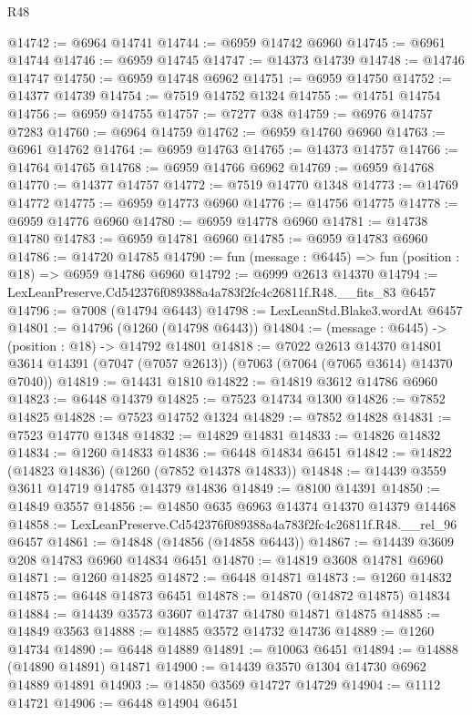 \begin{lexlean}{R48}
\begin{coremodule}
@14742 := @6964 @14741
@14744 := @6959 @14742 @6960
@14745 := @6961 @14744
@14746 := @6959 @14745
@14747 := @14373 @14739
@14748 := @14746 @14747
@14750 := @6959 @14748 @6962
@14751 := @6959 @14750
@14752 := @14377 @14739
@14754 := @7519 @14752 @1324
@14755 := @14751 @14754
@14756 := @6959 @14755
@14757 := @7277 @38
@14759 := @6976 @14757 @7283
@14760 := @6964 @14759
@14762 := @6959 @14760 @6960
@14763 := @6961 @14762
@14764 := @6959 @14763
@14765 := @14373 @14757
@14766 := @14764 @14765
@14768 := @6959 @14766 @6962
@14769 := @6959 @14768
@14770 := @14377 @14757
@14772 := @7519 @14770 @1348
@14773 := @14769 @14772
@14775 := @6959 @14773 @6960
@14776 := @14756 @14775
@14778 := @6959 @14776 @6960
@14780 := @6959 @14778 @6960
@14781 := @14738 @14780
@14783 := @6959 @14781 @6960
@14785 := @6959 @14783 @6960
@14786 := @14720 @14785
@14790 := fun (message : @6445) => fun (position : @18) => @6959 @14786 @6960
@14792 := @6999 @2613 @14370
@14794 := LexLeanPreserve.Cd542376f089388a4a783f2fc4c26811f.R48.__fits_83 @6457
@14796 := @7008 (@14794 @6443)
@14798 := LexLeanStd.Blake3.wordAt @6457
@14801 := @14796 (@1260 (@14798 @6443))
@14804 := (message : @6445) -> (position : @18) -> @14792 @14801
@14818 := @7022
    @2613
    @14370
    @14801
    @3614
    @14391
    (@7047 (@7057 @2613))
    (@7063 (@7064 (@7065 @3614) @14370 @7040))
@14819 := @14431 @1810
@14822 := @14819 @3612 @14786 @6960
@14823 := @6448 @14379
@14825 := @7523 @14734 @1300
@14826 := @7852 @14825
@14828 := @7523 @14752 @1324
@14829 := @7852 @14828
@14831 := @7523 @14770 @1348
@14832 := @14829 @14831
@14833 := @14826 @14832
@14834 := @1260 @14833
@14836 := @6448 @14834 @6451
@14842 := @14822 (@14823 @14836) (@1260 (@7852 @14378 @14833))
@14848 := @14439 @3559 @3611 @14719 @14785 @14379 @14836
@14849 := @8100 @14391
@14850 := @14849 @3557
@14856 := @14850 @635 @6963 @14374 @14370 @14379 @14468
@14858 := LexLeanPreserve.Cd542376f089388a4a783f2fc4c26811f.R48.__rel_96 @6457
@14861 := @14848 (@14856 (@14858 @6443))
@14867 := @14439 @3609 @208 @14783 @6960 @14834 @6451
@14870 := @14819 @3608 @14781 @6960
@14871 := @1260 @14825
@14872 := @6448 @14871
@14873 := @1260 @14832
@14875 := @6448 @14873 @6451
@14878 := @14870 (@14872 @14875) @14834
@14884 := @14439 @3573 @3607 @14737 @14780 @14871 @14875
@14885 := @14849 @3563
@14888 := @14885 @3572 @14732 @14736
@14889 := @1260 @14734
@14890 := @6448 @14889
@14891 := @10063 @6451
@14894 := @14888 (@14890 @14891) @14871
@14900 := @14439 @3570 @1304 @14730 @6962 @14889 @14891
@14903 := @14850 @3569 @14727 @14729
@14904 := @1112 @14721
@14906 := @6448 @14904 @6451

\end{coremodule}
\end{lexlean}
